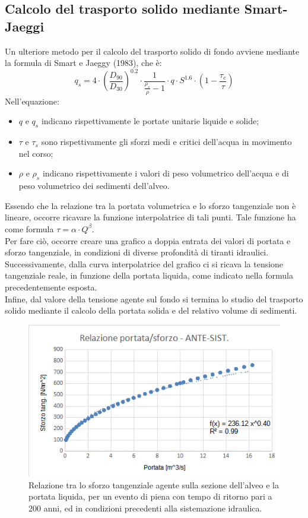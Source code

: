 \subsection{Calcolo del trasporto solido mediante Smart-Jaeggi}
Un ulteriore metodo per il calcolo del trasporto solido di fondo avviene mediante la formula di Smart e Jaeggy (1983), che è:
\begin{equation}
    q_s = 4 \cdot \left(\frac{D_{90}}{D_{30}}\right)^{0.2} \cdot \frac{1}{\frac{\rho_s}{\rho} -1} \cdot q \cdot S^{1.6} \cdot \left( 1 - \frac{\tau_c}{\tau}\right)
\end{equation}
Nell'equazione:
\begin{itemize}
    \item $q$ e $q_s$ indicano rispettivamente le portate unitarie liquide e solide;
    \item $\tau$ e $\tau_s$ sono rispettivamente gli sforzi medi e critici dell'acqua in movimento nel corso;
    \item $\rho$ e $\rho_s$ indicano rispettivamente i valori di peso volumetrico dell'acqua e di peso volumetrico dei sedimenti dell'alveo.
\end{itemize}
Essendo che la relazione tra la portata volumetrica e lo sforzo tangenziale non è lineare, occorre ricavare la funzione interpolatrice di tali punti. Tale funzione ha come formula $\tau = \alpha \cdot Q^{\beta}$.\\
Per fare ciò, occorre creare una grafico a doppia entrata dei valori di portata e sforzo tangenziale, in condizioni di diverse profondità di tiranti idraulici.\\
Successivamente, dalla curva interpolatrice del grafico ci si ricava la tensione tangenziale reale, in funzione della portata liquida, come indicato nella formula precedentemente esposta.\\
Infine, dal valore della tensione agente sul fondo si termina lo studio del trasporto solido mediante il calcolo della portata solida e del relativo volume di sedimenti.\\
\begin{figure}[H] \centering
    \includegraphics[scale=0.75]{immagini/rel_port_sforzo_ante_sist.png}
    \caption{Relazione tra lo sforzo tangenziale agente sulla sezione dell'alveo e la portata liquida, per un evento di piena con tempo di ritorno pari a 200 anni, ed in condizioni precedenti alla sistemazione idraulica.}
    \label{rel_port_sforzo_ante_sist}
\end{figure}
